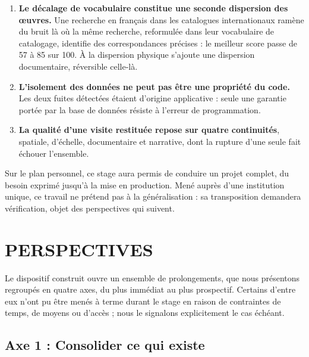 \begin{enumerate}
  \item \textbf{Le décalage de vocabulaire constitue une seconde dispersion des
        œuvres.} Une recherche en français dans les catalogues internationaux
        ramène du bruit là où la même recherche, reformulée dans leur
        vocabulaire de catalogage, identifie des correspondances précises : le
        meilleur score passe de 57 à 85 sur 100. À la dispersion physique
        s'ajoute une dispersion documentaire, réversible celle-là.

  \item \textbf{L'isolement des données ne peut pas être une propriété du
        code.} Les deux fuites détectées étaient d'origine applicative : seule
        une garantie portée par la base de données résiste à l'erreur de
        programmation.

  \item \textbf{La qualité d'une visite restituée repose sur quatre
        continuités}, spatiale, d'échelle, documentaire et narrative, dont la
        rupture d'une seule fait échouer l'ensemble.
\end{enumerate}

Sur le plan personnel, ce stage aura permis de conduire un projet complet, du
besoin exprimé jusqu'à la mise en production. Mené auprès d'une institution
unique, ce travail ne prétend pas à la généralisation : sa transposition
demandera vérification, objet des perspectives qui suivent.

\cleardoublepage
{}
\chapter*{PERSPECTIVES}

Le dispositif construit ouvre un ensemble de prolongements, que nous présentons
regroupés en quatre axes, du plus immédiat au plus prospectif. Certains d'entre
eux n'ont pu être menés à terme durant le stage en raison de contraintes de
temps, de moyens ou d'accès ; nous le signalons explicitement le cas échéant.

\section*{Axe 1 : Consolider ce qui existe}

